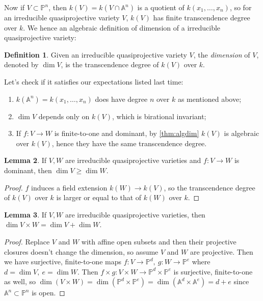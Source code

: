 \documentclass{article}
\newcommand{\A}{\mathbb{A}}
\newcommand{\p}{\mathbb{P}}
\theoremstyle{definition}
\newtheorem{defn}{Definition}[subsection]
\newtheorem{lemma}[defn]{Lemma}
\begin{document}
Now if $V\subset\p^n$, then $k(V)=k(V\cap\A^n)$ is a quotient of $k(x_1,\ldots,x_n)$, so for an irreducible quasiprojective variety $V$, $k(V)$ has finite transcendence degree over $k$. We hence an algebraic definition of dimension of a irreducible quasiprojective variety:

\begin{defn}
Given an irreducible quasiprojective variety $V$, the \textit{dimension} of $V$, denoted by $\dim V$, is the transcendence degree of $k(V)$ over $k$.
\end{defn}
Let's check if it satisfies our expectations listed last time:
\begin{enumerate}
\item $k(\A^n)=k(x_1,\ldots,x_n)$ does have degree $n$ over $k$ as mentioned above;
\item $\dim V$ depends only on $k(V)$, which is birational invariant;
\item If $f:V\rightarrow W$ is finite-to-one and dominant, by \ref{thm:algdim} $k(V)$ is algebraic over $k(V)$, hence they have the same transcendence degree.
\end{enumerate}

\begin{lemma}
If $V,W$ are irreducible quasiprojective varieties and $f:V\rightarrow W$ is dominant, then $\dim V\geq\dim W$.
\end{lemma}
\begin{proof}
$f$ induces a field extension $k(W)\rightarrow k(V)$, so the transcendence degree of $k(V)$ over $k$ is larger or equal to that of $k(W)$ over $k$.
\end{proof}

\begin{lemma}
\label{lemma:dimofprodissumofdim}
If $V,W$ are irreducible quasiprojective varieties, then $\dim V\times W=\dim V+\dim W$.
\end{lemma}
\begin{proof}
Replace $V$ and $W$ with affine open subsets and then their projective closures doesn't change the dimension, so assume $V$ and $W$ are projective. Then we have surjective, finite-to-one maps $f:V\rightarrow\p^d,\ g:W\rightarrow\p^e$ where $d=\dim V,\ e=\dim W$. Then $f\times g:V\times W\rightarrow\p^d\times\p^e$ is surjective, finite-to-one as well, so $\dim (V\times W)=\dim(\p^d\times\p^e)=\dim(\A^d\times\A^e)=d+e$ since $\A^n\subset\p^n$ is open.
\end{proof}
\end{document}
